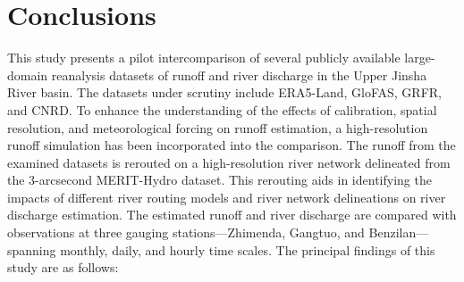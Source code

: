 \documentclass[preprint, review, authoryear, longtitle, 12pt, 3p]{elsarticle}
\begin{document}
\section{Conclusions}

This study presents a pilot intercomparison of several publicly available large-domain reanalysis datasets of runoff and river discharge in the Upper Jinsha River basin. The datasets under scrutiny include ERA5-Land, GloFAS, GRFR, and CNRD. To enhance the understanding of the effects of calibration, spatial resolution, and meteorological forcing on runoff estimation, a high-resolution runoff simulation has been incorporated into the comparison. The runoff from the examined datasets is rerouted on a high-resolution river network delineated from the 3-arcsecond MERIT-Hydro dataset. This rerouting aids in identifying the impacts of different river routing models and river network delineations on river discharge estimation. The estimated runoff and river discharge are compared with observations at three gauging stations—Zhimenda, Gangtuo, and Benzilan—spanning monthly, daily, and hourly time scales. The principal findings of this study are as follows:
\end{document}
